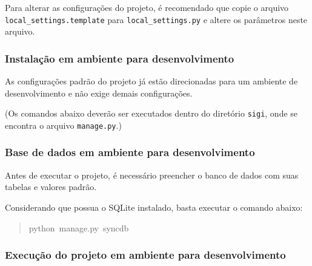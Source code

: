 Para alterar as configurações do projeto, é recomendado que copie o
arquivo \texttt{local{\_}settings.template} para \texttt{local{\_}settings.py} e
altere os parâmetros neste arquivo.



\hypertarget{instala-o-em-ambiente-para-desenvolvimento}{}
\subsubsection*{Instalação em ambiente para desenvolvimento}

As configurações padrão do projeto já estão direcionadas para um
ambiente de desenvolvimento e não exige demais configurações.

(Os comandos abaixo deverão ser executados dentro do diretório
\texttt{sigi}, onde se encontra o arquivo \texttt{manage.py}.)



\hypertarget{base-de-dados-em-ambiente-para-desenvolvimento}{}
\subsubsection*{Base de dados em ambiente para desenvolvimento}

Antes de executar o projeto, é necessário preencher o banco de dados
com suas tabelas e valores padrão.

Considerando que possua o SQLite instalado, basta executar o comando
abaixo:
\begin{quote}{\ttfamily \raggedright \noindent
python~manage.py~syncdb
}\end{quote}



\hypertarget{execu-o-do-projeto-em-ambiente-para-desenvolvimento}{}
\subsubsection*{Execução do projeto em ambiente para desenvolvimento}


